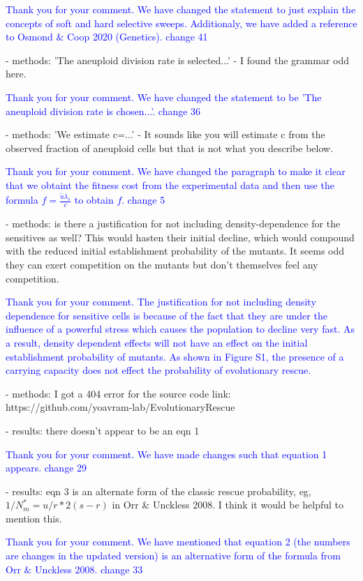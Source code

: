 \documentclass[11pt,a4paper]{article}
\begin{document}
\textcolor{blue}{Thank you for your comment. We have changed the statement to just explain the concepts of soft and hard selective sweeps. Additionaly, we have added a reference to Osmond $\&$ Coop 2020 (Genetics). change 41} 

- methods: 'The aneuploid division rate is selected...' - I found the grammar odd here.

\textcolor{blue}{Thank you for your comment. We have changed the statement to be 'The aneuploid division rate is chosen...'.   change 36} 

- methods: 'We estimate c=...' - It sounds like you will estimate c from the observed fraction of aneuploid cells but that is not what you describe below.

\textcolor{blue}{Thank you for your comment. We have changed the paragraph to make it clear that we obtaint the fitness cost from the experimental data and then use the formula $f=\frac{\tilde{u}\lambda_s}{c}$ to obtain $f$. change 5} 

- methods: is there a justification for not including density-dependence for the sensitives as well? This would hasten their initial decline, which would compound with the reduced initial establishment probability of the mutants. It seems odd they can exert competition on the mutants but don't themselves feel any competition.

\textcolor{blue}{Thank you for your comment. The justification for not including density dependence for sensitive cells is because of the fact that they are under the influence of a powerful stress which causes the population to decline very fast. As a result, density dependent effects will not have an effect on the initial establishment probability of mutants.  As shown in Figure S1, the presence of a carrying capacity does not effect the probability of evolutionary rescue.} 

- methods: I got a 404 error for the source code link: https://github.com/yoavram-lab/EvolutionaryRescue

- results: there doesn't appear to be an eqn 1

\textcolor{blue}{Thank you for your comment. We have made changes such that equation 1 appears. change 29} 

- results: eqn 3 is an alternate form of the classic rescue probability, eg, $1/N_m^*=u/r*2(s-r)$ in Orr $\&$ Unckless 2008. I think it would be helpful to mention this.

\textcolor{blue}{Thank you for your comment. We have mentioned that equation 2 (the numbers are changes in the updated version) is an alternative form of the formula from Orr $\&$ Unckless 2008. change 33} 
\end{document}

